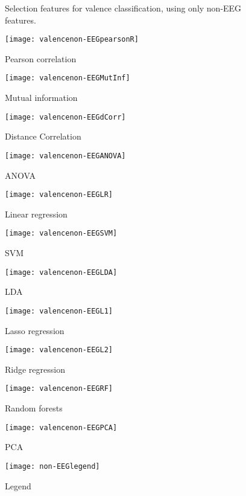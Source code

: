 \clearpage

\begin{figure}[!tbp]
  \centering
  \caption{Selection features for valence classification, using only non-EEG features.\label{valencenon-EEGpies}}
  \begin{minipage}[b]{0.3\textwidth}
    \texttt{[image: valencenon-EEGpearsonR]}
    \caption{Pearson correlation}
  \end{minipage}
  \hfill
  \begin{minipage}[b]{0.3\textwidth}
    \texttt{[image: valencenon-EEGMutInf]}
    \caption{Mutual information}
  \end{minipage}
  \hfill
  \begin{minipage}[b]{0.3\textwidth}
    \texttt{[image: valencenon-EEGdCorr]}
    \caption{Distance Correlation}
  \end{minipage}
  
  \begin{minipage}[b]{0.3\textwidth}
    \texttt{[image: valencenon-EEGANOVA]}
    \caption{ANOVA}
  \end{minipage}
  \hfill
  \begin{minipage}[b]{0.3\textwidth}
    \texttt{[image: valencenon-EEGLR]}
    \caption{Linear regression}
  \end{minipage}
  \hfill
  \begin{minipage}[b]{0.3\textwidth}
    \texttt{[image: valencenon-EEGSVM]}
    \caption{SVM}
  \end{minipage}
  
  \begin{minipage}[b]{0.3\textwidth}
    \texttt{[image: valencenon-EEGLDA]}
    \caption{LDA}
  \end{minipage}
  \hfill
  \begin{minipage}[b]{0.3\textwidth}
    \texttt{[image: valencenon-EEGL1]}
    \caption{Lasso regression}
  \end{minipage}
  \hfill
  \begin{minipage}[b]{0.3\textwidth}
    \texttt{[image: valencenon-EEGL2]}
    \caption{Ridge regression}
  \end{minipage}
  
  \begin{minipage}[b]{0.3\textwidth}
    \texttt{[image: valencenon-EEGRF]}
    \caption{Random forests}
  \end{minipage}
  \hfill
  \begin{minipage}[b]{0.3\textwidth}
    \texttt{[image: valencenon-EEGPCA]} %
    \caption{PCA}
  \end{minipage}
  \hfill
  \begin{minipage}[b]{0.3\textwidth}
    \texttt{[image: non-EEGlegend]}
    \caption{Legend\label{valencepieslegend}}
  \end{minipage}
\end{figure}
\clearpage
